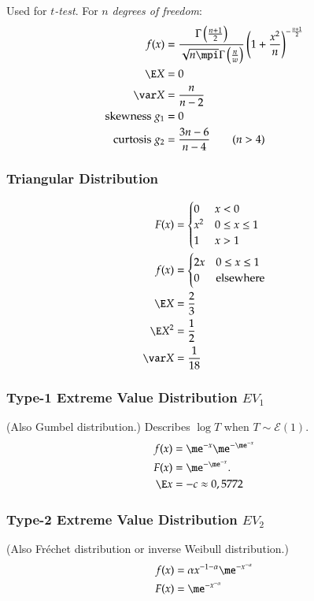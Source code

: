 \documentclass[a4paper]{article}
\numberwithin{equation}{subsection}
\begin{document}
Used for \emph{$t$-test}.  For $n$ \emph{degrees of freedom}:
\begin{align}
  f(x)
  &=
  \frac{\Gamma \left( \frac{n + 1}{2} \right)}
  {\sqrt{n \mpi} \Gamma \left( \frac{n}{w} \right)}
  \left(
    1 + \frac{x^{2}}{n}
  \right)^{-\frac{n + 1}{2}}
  \\
  \E X &= 0
  \\
  \var X &= \frac{n}{n - 2}
  \\
  \text{skewness } g_{1} &= 0
  \\
  \text{curtosis } g_{2} &= \frac{3n - 6}{n - 4} \qquad (n > 4)
\end{align}

\subsubsection{Triangular Distribution}

\begin{align}
  F(x) &= 
         \begin{cases}
           0 & x < 0\\
           x^{2} & 0 \le x \le 1\\
           1 & x > 1
         \end{cases}
  \\               
  f(x) &= 
         \begin{cases}
           2x & 0 \le x \le 1\\
           0 & \text{elsewhere}
         \end{cases}
  \\
  \E X &= \frac{2}{3}
  \\
  \E X^{2} &= \frac{1}{2}
  \\
  \var X &= \frac{1}{18}
\end{align}

\subsubsection{Type-1 Extreme Value Distribution $EV_{1}$}
(Also Gumbel distribution.)
Describes $\log T$ when $T \sim \mathcal{E}(1)$.
\begin{align}
f(x) &= \me^{-x} \me^{-\me^{-x}}
\\
F(x) &=  \me^{-\me^{-x}}.
\\
\E x &= -c \approx 0,5772
\end{align}

\subsubsection{Type-2 Extreme Value Distribution $EV_{2}$}
(Also Fréchet distribution or inverse Weibull distribution.)
\begin{align}
  f(x) &= \alpha x^{-1-\alpha} \me^{-x^{-\alpha}}
  \\
  F(x) &= \me^{-x^{-\alpha}}
\end{align}
\end{document}

